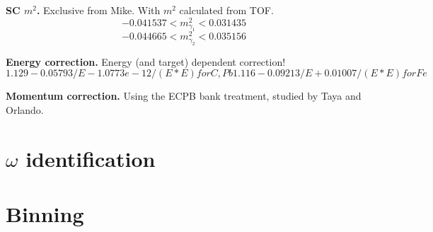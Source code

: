 \textbf{SC $m^2$.} Exclusive from Mike. With $m^2$ calculated from TOF.
\begin{equation}
    -0.041537 < m^2_{\gamma_1} < 0.031435
\end{equation}
\begin{equation}
    -0.044665 < m^2_{\gamma_2} < 0.035156
\end{equation}

\textbf{Energy correction.} Energy (and target) dependent correction!
\begin{equation}
    1.129-0.05793/E-1.0773e-12/(E*E) for C, Pb 
    1.116-0.09213/E+0.01007/(E*E) for Fe
\end{equation}

\textbf{Momentum correction.} Using the ECPB bank treatment, studied by Taya and Orlando.

\section{$\omega$ identification}




\section{Binning}



